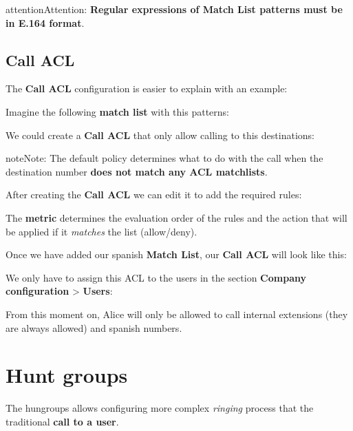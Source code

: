 \documentclass[letterpaper,10pt,english]{sphinxmanual}
\begin{document}
\begin{notice}{attention}{Attention:}
\textbf{Regular expressions of Match List patterns must be in E.164 format}.
\end{notice}


\subsection{Call ACL}
\label{company/call_permissions:call-acl}
The \textbf{Call ACL} configuration is easier to explain with an example:

Imagine the following \textbf{match list} with this patterns:

\noindent{}

We could create a \textbf{Call ACL} that only allow calling to this destinations:

\noindent{}

\begin{notice}{note}{Note:}
The default policy determines what to do with the call when the
destination number \textbf{does not match any ACL matchlists}.
\end{notice}

After creating the \textbf{Call ACL} we can edit it to add the required rules:

\noindent{}

The \textbf{metric} determines the evaluation order of the rules and the action
that will be applied if it \emph{matches} the list (allow/deny).

\noindent{}

Once we have added our spanish \textbf{Match List}, our \textbf{Call ACL} will
look like this:

\noindent{}

We only have to assign this ACL to the users in the section \textbf{Company
configuration} \textgreater{} \textbf{Users}:

\noindent{}

From this moment on, Alice will only be allowed to call internal extensions
(they are always allowed) and spanish numbers.


\section{Hunt groups}
\label{company/huntgroups:hunt-groups}\label{company/huntgroups::doc}\label{company/huntgroups:huntgroups}
The hungroups allows configuring more complex \emph{ringing} process that the
traditional \textbf{call to a user}.
\end{document}
